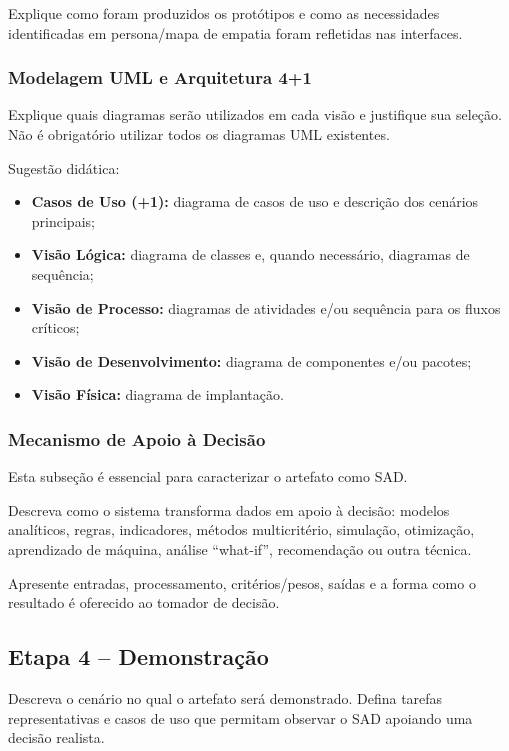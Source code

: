 \documentclass[12pt]{article}
\begin{document}
Explique como foram produzidos os protótipos e como as necessidades identificadas em persona/mapa de empatia foram refletidas nas interfaces.

\subsubsection{Modelagem UML e Arquitetura 4+1}

Explique quais diagramas serão utilizados em cada visão e justifique sua seleção. Não é obrigatório utilizar todos os diagramas UML existentes.

Sugestão didática:
\begin{itemize}[noitemsep]
    \item \textbf{Casos de Uso (+1):} diagrama de casos de uso e descrição dos cenários principais;
    \item \textbf{Visão Lógica:} diagrama de classes e, quando necessário, diagramas de sequência;
    \item \textbf{Visão de Processo:} diagramas de atividades e/ou sequência para os fluxos críticos;
    \item \textbf{Visão de Desenvolvimento:} diagrama de componentes e/ou pacotes;
    \item \textbf{Visão Física:} diagrama de implantação.
\end{itemize}

\subsubsection{Mecanismo de Apoio à Decisão}

Esta subseção é essencial para caracterizar o artefato como SAD.

Descreva como o sistema transforma dados em apoio à decisão: modelos analíticos, regras, indicadores, métodos multicritério, simulação, otimização, aprendizado de máquina, análise ``what-if'', recomendação ou outra técnica.

Apresente entradas, processamento, critérios/pesos, saídas e a forma como o resultado é oferecido ao tomador de decisão.

\subsection{Etapa 4 -- Demonstração}

Descreva o cenário no qual o artefato será demonstrado. Defina tarefas representativas e casos de uso que permitam observar o SAD apoiando uma decisão realista.
\end{document}

